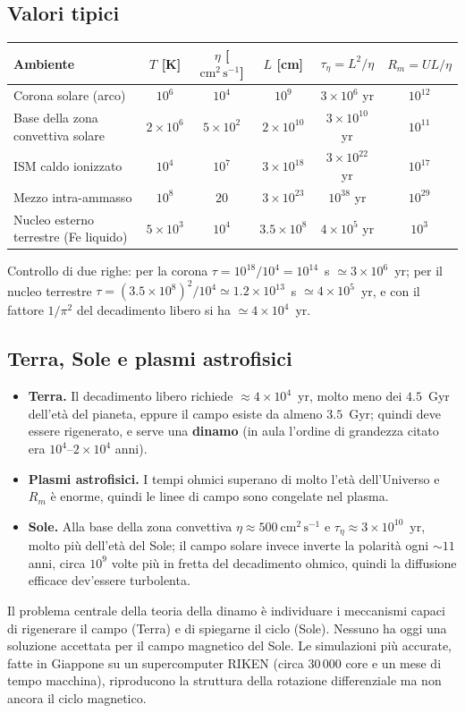 \subsection{Valori tipici}
\begin{center}
\small
\begin{tabular}{|l|c|c|c|c|c|}
\hline
Ambiente & $T$ [K] & $\eta$ [$\mathrm{cm^2\,s^{-1}}$] & $L$ [cm] & $\tau_\eta=L^2/\eta$ & $R_m=UL/\eta$\\
\hline
Corona solare (arco) & $10^{6}$ & $10^{4}$ & $10^{9}$ & $3\times10^{6}$ yr & $10^{12}$\\
Base della zona convettiva solare & $2\times10^{6}$ & $5\times10^{2}$ & $2\times10^{10}$ & $3\times10^{10}$ yr & $10^{11}$\\
ISM caldo ionizzato & $10^{4}$ & $10^{7}$ & $3\times10^{18}$ & $3\times10^{22}$ yr & $10^{17}$\\
Mezzo intra-ammasso & $10^{8}$ & $20$ & $3\times10^{23}$ & $10^{38}$ yr & $10^{29}$\\
Nucleo esterno terrestre (Fe liquido) & $5\times10^{3}$ & $10^{4}$ & $3.5\times10^{8}$ & $4\times10^{5}$ yr & $10^{3}$\\
\hline
\end{tabular}
\end{center}
Controllo di due righe: per la corona $\tau=10^{18}/10^{4}=10^{14}$~s $\simeq3\times10^{6}$~yr; per il nucleo terrestre $\tau=(3.5\times10^{8})^2/10^{4}\simeq1.2\times10^{13}$~s $\simeq4\times10^{5}$~yr, e con il fattore $1/\pi^2$ del decadimento libero si ha $\simeq4\times10^{4}$~yr.

\subsection{Terra, Sole e plasmi astrofisici}
\begin{itemize}
\item \textbf{Terra.} Il decadimento libero richiede $\approx4\times10^{4}$~yr, molto meno dei $4.5$~Gyr dell'età del pianeta, eppure il campo esiste da almeno $3.5$~Gyr; quindi deve essere rigenerato, e serve una \textbf{dinamo} (in aula l'ordine di grandezza citato era $10^4$--$2\times10^4$ anni).
\item \textbf{Plasmi astrofisici.} I tempi ohmici superano di molto l'età dell'Universo e $R_m$ è enorme, quindi le linee di campo sono congelate nel plasma.
\item \textbf{Sole.} Alla base della zona convettiva $\eta\approx500~\mathrm{cm^2\,s^{-1}}$ e $\tau_\eta\approx3\times10^{10}$~yr, molto più dell'età del Sole; il campo solare invece inverte la polarità ogni $\sim11$ anni, circa $10^9$ volte più in fretta del decadimento ohmico, quindi la diffusione efficace dev'essere turbolenta.
\end{itemize}
Il problema centrale della teoria della dinamo è individuare i meccanismi capaci di rigenerare il campo (Terra) e di spiegarne il ciclo (Sole). Nessuno ha oggi una soluzione accettata per il campo magnetico del Sole. Le simulazioni più accurate, fatte in Giappone su un supercomputer RIKEN (circa 30\,000 core e un mese di tempo macchina), riproducono la struttura della rotazione differenziale ma non ancora il ciclo magnetico.


